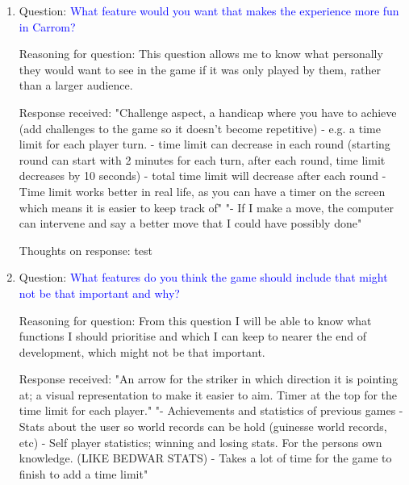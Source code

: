 \documentclass[11pt,a4paper]{report}
\begin{document}
\begin{enumerate}
    \colorbox{l-purple}{Thoughts on response:} \noindent \textcolor{d-purple}{Based on this answer, I can tailor my game to suit my clients needs}




    \item \colorbox{l-blue}{Question:} \textcolor{blue}{What feature would you want that makes the experience more fun in Carrom?}

    \colorbox{l-green}{Reasoning for question:} \textcolor{dark-green}{This question allows me to know what personally they would want to see in the game if it was only played by them, rather than a larger audience.}

    \colorbox{l-red}{Response received:} \noindent \textcolor{crimson-red}{"Challenge aspect, a handicap where you have to achieve (add challenges to the game so it doesn't become repetitive)
- e.g. a time limit for each player turn.
- time limit can decrease in each round (starting round can start with 2 minutes for each turn, after each round, time limit decreases by 10 seconds)
- total time limit will decrease after each round
- Time limit works better in real life, as you can have a timer on the screen which means it is easier to keep track of" \newline \newline "- If I make a move, the computer can intervene and say a better move that I could have possibly done"}

    \colorbox{l-purple}{Thoughts on response:} \noindent \textcolor{d-purple}{test}





    \item \colorbox{l-blue}{Question:} \textcolor{blue}{What features do you think the game should include that might not be that important and why?}

    \colorbox{l-green}{Reasoning for question:} \textcolor{dark-green}{From this question I will be able to know what functions I should prioritise and which I can keep to nearer the end of development, which might not be that important.}

    \colorbox{l-red}{Response received:} \noindent \textcolor{crimson-red}{"An arrow for the striker in which direction it is pointing at; a visual representation to make it easier to aim. Timer at the top for the time limit for each player." \newline "- Achievements and statistics of previous games
- Stats about the user so world records can be hold (guinesse world records, etc)
- Self player statistics; winning and losing stats. For the persons own knowledge. (LIKE BEDWAR STATS)
- Takes a lot of time for the game to finish to add a time limit"}


\end{enumerate}
\end{document}
